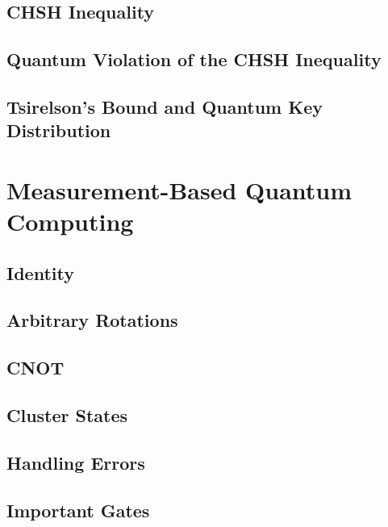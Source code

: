 	\section{CHSH Inequality} %

	\section{Quantum Violation of the CHSH Inequality} %

	\section{Tsirelson's Bound and Quantum Key Distribution} %

\chapter{Measurement-Based Quantum Computing} %

	\section{Identity} %

	\section{Arbitrary Rotations} %

	\section{CNOT} %

	\section{Cluster States} %

	\section{Handling Errors} %

	\section{Important Gates} %

